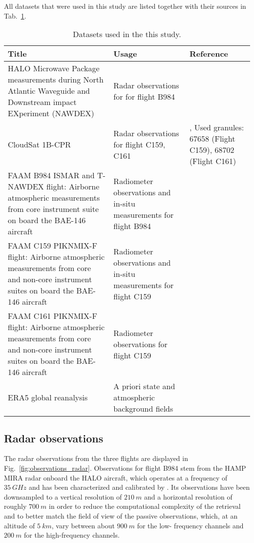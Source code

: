 \documentclass[journal abbreviation, manuscript]{copernicus}
\begin{document}
All datasets that were used in this study are listed together with their
sources in Tab.~\ref{tab:data}.

\begin{table}
  \centering
  \caption{Datasets used in the this study.}
  \begin{tabular}{p{5cm}|p{5cm}|p{3cm}}
     Title &  Usage &  Reference \\
    \hline
    \hline

    HALO Microwave Package measurements during North Atlantic Waveguide and
    Downstream impact EXperiment (NAWDEX)
    & Radar observations for for flight B984
    & \citet{hamp_nawdex} \\
    \hline

    CloudSat 1B-CPR
    & Radar observations for flight C159, C161
    &  \citet{tanelli08}, Used granules: 67658 (Flight C159), 68702 (Flight C161)  \\
    \hline

    FAAM B984 ISMAR and T-NAWDEX flight: Airborne atmospheric measurements from
    core instrument suite on board the BAE-146 aircraft
    & Radiometer observations and in-situ measurements for flight B984
    & \citet{faam_nawdex_obs} \\
    \hline

  FAAM C159 PIKNMIX-F flight: Airborne atmospheric measurements from core and
  non-core instrument suites on board the BAE-146 aircraft
  & Radiometer observations and in-situ measurements for flight C159
  & \citet{faam_c159_obs} \\
    \hline

  FAAM C161 PIKNMIX-F flight: Airborne atmospheric measurements from core and
  non-core instrument suites on board the BAE-146 aircraft
    & Radiometer observations for flight C159
    & \citet{faam_c161_obs} \\
    \hline 

    ERA5 global reanalysis
    & A priori state and atmospheric background fields
    & \citet{era5}
  \end{tabular}
  \label{tab:data}
\end{table}


\subsection{Radar observations}

The radar observations from the three flights are displayed in
Fig.~\ref{fig:observations_radar}. Observations for flight B984 stem from the
HAMP MIRA radar \citep{mech14} onboard the HALO aircraft, which operates at a
frequency of $35\ \unit{GHz}$ and has been characterized and calibrated by
\citep{ewald19}. Its observations have been downsampled to a vertical resolution
of $210\ \unit{m}$ and a horizontal resolution of roughly $700\ \unit{m}$ in
order to reduce the computational complexity of the retrieval and to better
match the field of view of the passive observations, which, at an altitude of
$5\ \unit{km}$, vary between about $900\ \unit{m}$ for the low- frequency
channels and $200\ \unit{m}$ for the high-frequency channels.
\end{document}

